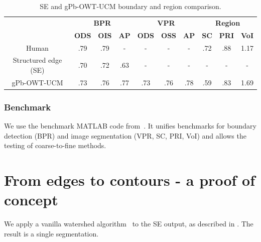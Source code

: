 \begin{table}[htbp]
\renewcommand{\arraystretch}{1.3}
\centering
\scriptsize
\begin{tabular}{l|c|c|c||c|c|c||c|c|c|}
\cline{2-10} %
\multirow{2}{*}{} & \multicolumn{3}{c||}{\textbf{BPR}} & \multicolumn{3}{c||}{\textbf{VPR}}& \multicolumn{3}{c|}{\textbf{Region}}\\
\cline{2-10}
& \textbf{ODS}  & \textbf{OIS} & \textbf{AP} %
& \textbf{ODS} & \textbf{OSS} & \textbf{AP} %
& \textbf{SC} & \textbf{PRI} & \textbf{VoI} \\
\hline
\multicolumn{1}{|c|}{Human} & .79 & .79 & - & - & - & - & .72 & .88 & 1.17 \\ %
\hline
\hline
\multicolumn{1}{|c|}{\cite{DollarICCV13edges} Structured edge (SE)} & .70 & .72 & .63 & - & - & - & - & - & - \\
\hline
\multicolumn{1}{|c|}{\cite{Arbelaez11} gPb-OWT-UCM} & .73 & .76 & .77 & .73 & .76 & .78 & .59 & .83 & 1.69 \\
\hline
\end{tabular}
\caption[SE and gPb-OWT-UCM boundary and region comparison]{SE and gPb-OWT-UCM boundary and region comparison.}
\label{tab:SE_vs_gPb_OWT_UCM}
\end{table}

\subsubsection*{Benchmark}
We use the benchmark MATLAB code from~\cite{Galasso13Benchmark}. %
It unifies benchmarks for boundary detection (BPR) and image segmentation (VPR, SC, %
PRI, VoI) and allows the testing of coarse-to-fine methods. %

\section{From edges to contours - a proof of concept}
We apply a vanilla watershed algorithm~\cite{beucher1992morphological,najman1996geodesic,PINKlibrary} to the SE output, as described in . The result is a single segmentation. 

